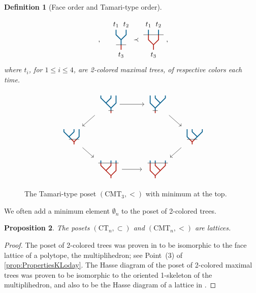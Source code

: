 \documentclass[twoside, 12pt]{amsart}
\newtheorem{definition}{Definition}[section]
\newtheorem{proposition}[definition]{Proposition}
\theoremstyle{remark}
\newcommand{\CT}[1]{\mathrm{CT}_{#1}}
\newcommand{\CMT}[1]{\mathrm{CMT}_{#1}}
\newcommand{\TreeLa}
{\vcenter{\hbox{
\begin{tikzpicture}[scale=0.25]
\draw[very thick, MidnightBlue] (0,-0.5)--(0,0) -- (-2,2)--(-2,2.5);
\draw[very thick, MidnightBlue] (-1,1)--(0,2)--(0,2.5) ;
\draw[very thick, MidnightBlue] (0,0)--(1,1)--(1,2.5) ;
%
\draw[very thick, BrickRed] (0,-0.5)--(0,-1) ;
%
\draw (-0.5,-0.5) --(0.5, -0.5);
\end{tikzpicture}}}}
\newcommand{\TreeLb}
{\vcenter{\hbox{
\begin{tikzpicture}[scale=0.25]
\draw[very thick, MidnightBlue] (-0.5,0.5)--(-2,2)--(-2,2.5);
\draw[very thick, MidnightBlue] (-1,1)--(0,2)--(0,2.5) ;
\draw[very thick, MidnightBlue] (0.5,0.5)--(1,1)--(1,2.5) ;
%
\draw[very thick, BrickRed] (0,0)--(0,-0.5) ;
\draw[very thick, BrickRed] (0,0)--(-0.5, 0.5) ;
\draw[very thick, BrickRed] (0,0)--(0.5,0.5) ;
%
\draw (-1,0.5) --(1, 0.5);
\end{tikzpicture}}}}
\newcommand{\TreeLc}
{\vcenter{\hbox{
\begin{tikzpicture}[scale=0.25]
\draw[very thick, MidnightBlue] (-2, 2.5)--(-2, 3) ;
\draw[very thick, MidnightBlue] (0, 2.5)--(0, 3) ;
\draw[very thick, MidnightBlue] (1, 2.5)--(1, 3) ;
%
\draw[very thick, BrickRed] (0,-0.5)--(0,0) -- (-2,2)--(-2,2.5);
\draw[very thick, BrickRed] (-1,1)--(0,2)--(0,2.5) ;
\draw[very thick, BrickRed] (0,0)--(1,1)--(1,2.5) ;
%
\draw (-2.5,2.5) --(1.5, 2.5);
\end{tikzpicture}}}}
\newcommand{\TreeRa}
{\vcenter{\hbox{
\begin{tikzpicture}[scale=0.25]
\draw[very thick, MidnightBlue] (0,-0.5)--(0,0) -- (2,2)--(2,2.5);
\draw[very thick, MidnightBlue] (1,1)--(0,2)--(0,2.5) ;
\draw[very thick, MidnightBlue] (0,0)--(-1,1)--(-1,2.5) ;
%
\draw[very thick, BrickRed] (0,-0.5)--(0,-1) ;
%
\draw (-0.5,-0.5) --(0.5, -0.5);
\end{tikzpicture}}}}
\newcommand{\TreeRb}
{\vcenter{\hbox{
\begin{tikzpicture}[scale=0.25]
\draw[very thick, MidnightBlue] (0.5,0.5) -- (2,2)--(2,2.5);
\draw[very thick, MidnightBlue] (1,1)--(0,2)--(0,2.5) ;
\draw[very thick, MidnightBlue] (-0.5,0.5)--(-1,1)--(-1,2.5) ;
%
\draw[very thick, BrickRed] (0,-0.5)--(0,0) ;
\draw[very thick, BrickRed] (0,0)--(0.5,0.5) ;
\draw[very thick, BrickRed] (0,0)--(-0.5,0.5) ;
%
\draw (-1,0.5) --(1, 0.5);
\end{tikzpicture}}}}
\newcommand{\TreeRc}
{\vcenter{\hbox{
\begin{tikzpicture}[scale=0.25]
\draw[very thick, BrickRed] (0,-0.5)--(0,0) -- (2,2)--(2,2.5);
\draw[very thick, BrickRed] (1,1)--(0,2)--(0,2.5) ;
\draw[very thick, BrickRed] (0,0)--(-1,1)--(-1,2.5) ;
%
\draw[very thick, MidnightBlue] (2,2.5)--(2,3) ;
\draw[very thick, MidnightBlue] (0,2.5)--(0,3) ;
\draw[very thick, MidnightBlue] (-1,2.5)--(-1,3) ;
%
\draw (-1.5,2.5) --(2.5, 2.5);
\end{tikzpicture}}}}
\begin{document}
\begin{definition}[Face order and Tamari-type order]
\begin{itemize}
\[{{{\begin{tikzpicture}[yscale=0.5,xscale=0.5]
\end{tikzpicture}}}}\ , \quad 
{\vcenter{\hbox{
\begin{tikzpicture}[yscale=0.5,xscale=0.5]
\draw[very thick, MidnightBlue] (0,0.5)--(0,1);
\draw[very thick, MidnightBlue] (0,1)--(-0.5,1.5)--(-0.5,2);
\draw[very thick, MidnightBlue] (0,1)--(0.5,1.5)--(0.5,2);
% 
\draw[very thick, BrickRed] (0,0)--(0,0.5);
\draw (-0.5,0.5) --(0.5, 0.5);
%
\draw (-0.5,2) node[above] {$t_1$}; 
\draw (0.5,2) node[above] {$t_2$}; 
\draw (0,0) node[below] {$t_3$}; 
\end{tikzpicture}}}}
\prec
{\vcenter{\hbox{
\begin{tikzpicture}[yscale=0.5,xscale=0.5]
\draw[very thick, MidnightBlue] (-0.5,2)--(-0.5,2.5);
\draw[very thick, MidnightBlue] (0.5,2)--(0.5,2.5);
%
\draw[very thick, BrickRed] (0,0.5)--(0,1);
\draw[very thick, BrickRed] (0,1)--(-0.5,1.5)--(-0.5,2);
\draw[very thick, BrickRed] (0,1)--(0.5,1.5)--(0.5,2);
% 
\draw (-1,2) --(1, 2);
%
\draw (-0.5,2.5) node[above] {$t_1$}; 
\draw (0.5,2.5) node[above] {$t_2$}; 
\draw (0,0.5) node[below] {$t_3$}; 
\end{tikzpicture}}}}
\ ,\]
where $t_i$, for $1\leq i\leq 4$, are 2-colored maximal trees, of respective colors each time. 
\end{itemize}
\end{definition}

\begin{figure}[h]
\[\vcenter{\hbox{
\begin{tikzcd}[column sep=0.5cm, row sep=0.5cm]
& \TreeLa \arrow[ld, thin] \arrow[rr, thin]&& \TreeRa \arrow[rd, thin]& \\
\TreeLb \arrow[rd, thin] &&&& \TreeRb \arrow[ld, thin] \\
& \TreeLc \arrow[rr, thin] && \TreeRc &
\end{tikzcd}
}}\]
\caption{The Tamari-type poset $(\CMT{3}, <)$ with minimum at the top.}
\label{Fig3:Tam}
\end{figure}

We often add a minimum element $\emptyset_n$ to the poset of 2-colored trees. 

\begin{proposition}
The posets $(\CT{n}, \subset)$ and $(\CMT{n}, <)$ are lattices. 
\end{proposition}

\begin{proof}
The poset of 2-colored trees was proven in \cite{Forcey08} to be isomorphic to the face lattice of a polytope, the multiplihedron; see Point~(3) of \cref{prop:PropertiesKLoday}. 
The Hasse diagram of the poset of 2-colored maximal trees was proven to be isomorphic to the oriented 1-skeleton of the multiplihedron, and also to be the Hasse diagram of a lattice in \cite[Proposition 117]{CP22}.
\end{proof}
\end{document}
